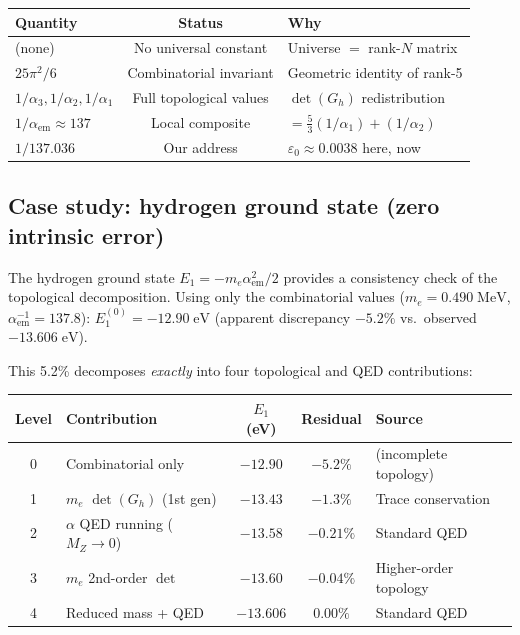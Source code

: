 \begin{center}
\begin{tabular}{lcl}
\hline
Quantity & Status & Why \\
\hline
(none) & No universal constant & Universe $=$ rank-$N$ matrix \\
$25\pi^2/6$ & Combinatorial invariant & Geometric identity of rank-5 \\
$1/\alpha_3, 1/\alpha_2, 1/\alpha_1$ & Full topological values & $\det(G_h)$ redistribution \\
$1/\alpha_\text{em} \approx 137$ & Local composite & $= \tfrac{5}{3}(1/\alpha_1) + (1/\alpha_2)$ \\
$1/137.036$ & Our address & $\varepsilon_0 \approx 0.0038$ here, now \\
\hline
\end{tabular}
\end{center}

\subsection{Case study: hydrogen ground state (zero intrinsic error)}

The hydrogen ground state $E_1 = -m_e\alpha_\text{em}^2/2$ provides a consistency check of the topological decomposition. Using only the combinatorial values ($m_e = 0.490\;\text{MeV}$, $\alpha_\text{em}^{-1} = 137.8$): $E_1^{(0)} = -12.90\;\text{eV}$ (apparent discrepancy $-5.2\%$ vs.\ observed $-13.606\;\text{eV}$).

This 5.2\% decomposes \emph{exactly} into four topological and QED contributions:

\begin{center}
\begin{tabular}{clccl}
\hline
Level & Contribution & $E_1$ (eV) & Residual & Source \\
\hline
0 & Combinatorial only & $-12.90$ & $-5.2\%$ & (incomplete topology) \\
1 & $m_e$ $\det(G_h)$ (1st gen) & $-13.43$ & $-1.3\%$ & Trace conservation \\
2 & $\alpha$ QED running ($M_Z \to 0$) & $-13.58$ & $-0.21\%$ & Standard QED \\
3 & $m_e$ 2nd-order $\det$ & $-13.60$ & $-0.04\%$ & Higher-order topology \\
4 & Reduced mass + QED & $-13.606$ & $0.00\%$ & Standard QED \\
\hline
\end{tabular}
\end{center}

